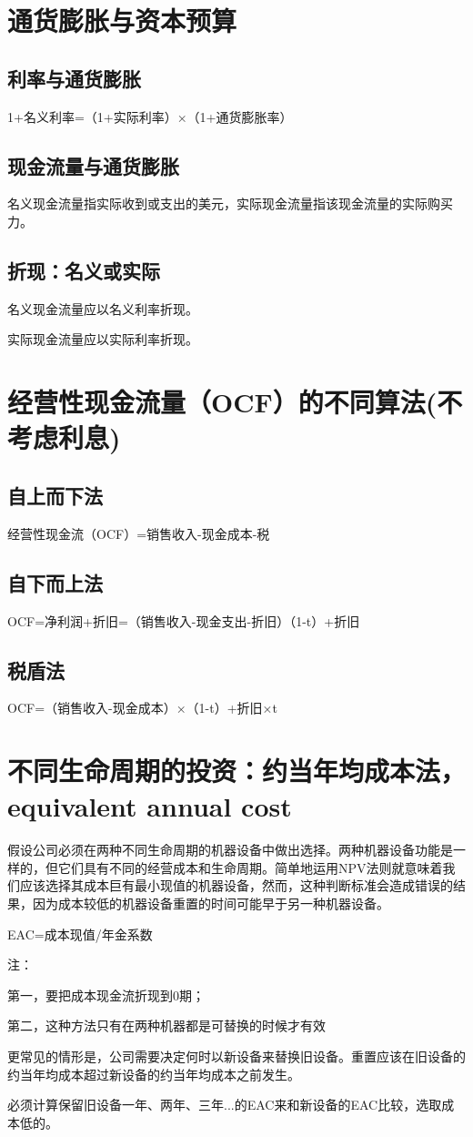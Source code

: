 \documentclass{article}
\begin{document}
\section{通货膨胀与资本预算}
\subsection{利率与通货膨胀}
1+名义利率=（1+实际利率）×（1+通货膨胀率）

\subsection{现金流量与通货膨胀}
名义现金流量指实际收到或支出的美元，实际现金流量指该现金流量的实际购买力。

\subsection{折现：名义或实际}
名义现金流量应以名义利率折现。

实际现金流量应以实际利率折现。

\section{经营性现金流量（OCF）的不同算法(不考虑利息)}
\subsection{自上而下法}
经营性现金流（OCF）=销售收入-现金成本-税

\subsection{自下而上法}
OCF=净利润+折旧=（销售收入-现金支出-折旧）（1-t）+折旧

\subsection{税盾法}
OCF=（销售收入-现金成本）×（1-t）+折旧×t

\section{不同生命周期的投资：约当年均成本法，equivalent annual cost}
假设公司必须在两种不同生命周期的机器设备中做出选择。两种机器设备功能是一样的，但它们具有不同的经营成本和生命周期。简单地运用NPV法则就意味着我们应该选择其成本巨有最小现值的机器设备，然而，这种判断标准会造成错误的结果，因为成本较低的机器设备重置的时间可能早于另一种机器设备。

EAC=成本现值/年金系数

\hspace*{\fill}

注：

第一，要把成本现金流折现到0期；

第二，这种方法只有在两种机器都是可替换的时候才有效

\hspace*{\fill}

更常见的情形是，公司需要决定何时以新设备来替换旧设备。重置应该在旧设备的约当年均成本超过新设备的约当年均成本之前发生。

必须计算保留旧设备一年、两年、三年...的EAC来和新设备的EAC比较，选取成本低的。
\end{document}
